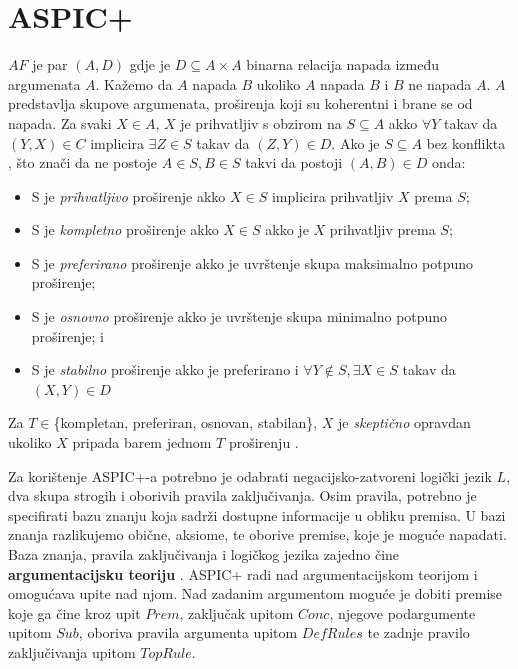 \section{ASPIC+}
\label{sec:aspic}

$AF$ je par $(A, D)$ gdje je $D \subseteq A \times A$ binarna relacija napada između argumenata $A$. 
Kažemo da $A$ napada $B$ ukoliko $A$ napada $B$ i $B$ ne napada $A$. $A$ 
predstavlja skupove argumenata, proširenja 
koji su koherentni i brane se od napada. 
Za svaki $X \in A$, $X$ je prihvatljiv s obzirom na $S \subseteq A$ akko
$\forall Y$ takav da $(Y, X) \in C$ implicira $\exists Z \in S$ takav da
$(Z, Y) \in D$. Ako je $S \subseteq A$ bez konflikta , što znači 
da ne postoje $A \in S, B \in S$ takvi da postoji $(A, B) \in D$ onda:
\begin{itemize}
    \item S je \emph{prihvatljivo} proširenje akko $X \in S$ implicira prihvatljiv $X$ prema $S$;
    \item S je \emph{kompletno} proširenje akko $X \in S$ akko je $X$ prihvatljiv prema $S$;
    \item S je \emph{preferirano} proširenje akko je uvrštenje skupa maksimalno potpuno proširenje; 
    \item S je \emph{osnovno} proširenje akko je uvrštenje skupa minimalno potpuno proširenje; i
    \item S je \emph{stabilno} proširenje akko je preferirano i $\forall Y \notin S, \exists X \in S$ takav da
        $(X, Y) \in D$
\end{itemize}
Za $T \in $\{kompletan, preferiran, osnovan, stabilan\}, $X$ je
\emph{skeptično} opravdan ukoliko $X$ pripada barem jednom $T$ proširenju
\citep{modgil2014aspic+}. 

Za korištenje ASPIC+-a potrebno je odabrati negacijsko-zatvoreni logički jezik $L$,
dva skupa strogih  i oborivih  pravila
zaključivanja. 
Osim pravila, potrebno je specifirati bazu znanju 
 koja sadrži dostupne informacije u obliku premisa. 
U bazi znanja razlikujemo obične, aksiome, te oborive premise, koje je moguće
napadati. Baza znanja, pravila zaključivanja i logičkog jezika
zajedno čine \textbf{argumentacijsku teoriju} .
ASPIC+ radi nad argumentacijskom teorijom i omogućava upite nad njom. 
Nad zadanim argumentom moguće je dobiti premise koje ga čine kroz
upit $Prem$, zaključak upitom $Conc$, 
njegove podargumente upitom $Sub$, oboriva pravila argumenta upitom $DefRules$ te
zadnje pravilo zaključivanja upitom $TopRule$. 

